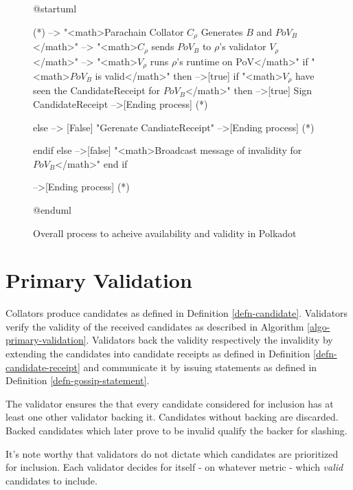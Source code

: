 \begin{figure}[h!]
\label{diag-anv-overall}
\begin{plantuml}
@startuml

(*) --> "<math>Parachain Collator $C_\rho$ Generates  $B$ and $PoV_B$</math>"
    --> "<math>$C_\rho$ sends $PoV_B$ to $\rho$'s validator $V_\rho$</math>"
    --> "<math>$V_{\rho}$ runs $\rho$'s runtime on PoV</math>"
    if "<math>$PoV_B$ is valid</math>" then
    -->[true] if  "<math>$V_{\rho}$ have seen the CandidateReceipt for $PoV_B$</math>" then
    -->[true] Sign CandidateReceipt
    -->[Ending process] (*)

    else
    --> [False] "Gerenate CandiateReceipt"
    -->[Ending process] (*)

    endif
    else
    -->[false] "<math>Broadcast message of invalidity for $PoV_B$</math>"
    end if

  -->[Ending process] (*)

@enduml
\end{plantuml}
\caption{Overall process to acheive availability and validity in Polkadot}
\end{figure}

\section{Primary Validation}
\label{sect-primary-validation}

Collators produce candidates as defined in Definition \ref{defn-candidate}.
Validators verify the validity of the received candidates as described in
Algorithm \ref{algo-primary-validation}.  Validators
back the validity respectively the invalidity by extending the candidates into 
candidate receipts as defined in Definition \ref{defn-candidate-receipt} and
communicate it by issuing statements as defined in Definition
\ref{defn-gossip-statement}.
\newline

The validator ensures the that every candidate considered for inclusion has at least
one other validator backing it. Candidates without backing are discarded. Backed candidates 
which later prove to be invalid qualify the backer for slashing.
\newline

It's note worthy that validators do not dictate which candidates are prioritized
for inclusion. Each validator decides for itself - on whatever metric - which
\textit{valid} candidates to include.

